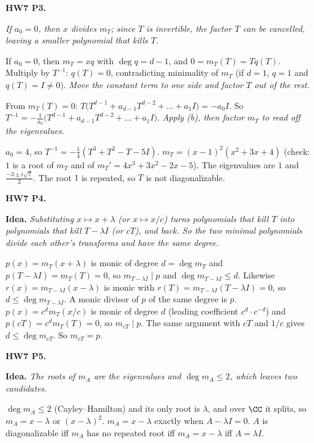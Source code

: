\documentclass[10pt]{scrartcl}
\newcommand{\idea}[1]{{\color{OliveGreen!75!black}\textbf{Idea.}} \textit{#1}\par}
\newenvironment{prob}{\par\medskip\noindent\begin{minipage}{\linewidth}\setlength{\parskip}{3pt}}{\end{minipage}\par}
\begin{document}
\begin{prob}
\textbf{HW7 P3. }\par 
\begin{enumerate}[(a)]
  \ii \idea{If $a_0=0$, then $x$ divides $m_T$; since $T$ is invertible, the factor $T$ can be cancelled, leaving a smaller polynomial that kills $T$.}
  If $a_0=0$, then $m_T=xq$ with $\deg q=d-1$, and $0=m_T(T)=Tq(T)$. Multiply by $T^{-1}$: $q(T)=0$, contradicting minimality of $m_T$ (if $d=1$, $q=1$ and $q(T)=I\ne0$).
  \ii \idea{Move the constant term to one side and factor $T$ out of the rest.}
  From $m_T(T)=0$: $T\big(T^{d-1}+a_{d-1}T^{d-2}+\dots+a_1I\big)=-a_0I$. So $T^{-1}=-\frac1{a_0}\big(T^{d-1}+a_{d-1}T^{d-2}+\dots+a_1I\big)$.
  \ii \idea{Apply (b), then factor $m_T$ to read off the eigenvalues.}
  $a_0=4$, so $T^{-1}=-\frac14(T^3+T^2-T-5I)$. $m_T=(x-1)^2(x^2+3x+4)$ (check: $1$ is a root of $m_T$ and of $m_T'=4x^3+3x^2-2x-5$). The eigenvalues are $1$ and $\frac{-3\pm i\sqrt7}2$. The root $1$ is repeated, so $T$ is not diagonalizable.
\end{enumerate}
\end{prob}

\begin{prob}
\textbf{HW7 P4. }\par 
\idea{Substituting $x\mapsto x+\lambda$ (or $x\mapsto x/c$) turns polynomials that kill $T$ into polynomials that kill $T-\lambda I$ (or $cT$), and back. So the two minimal polynomials divide each other's transforms and have the same degree.}
\begin{enumerate}[(a)]
  \ii $p(x)=m_T(x+\lambda)$ is monic of degree $d=\deg m_T$ and $p(T-\lambda I)=m_T(T)=0$, so $m_{T-\lambda I}\mid p$ and $\deg m_{T-\lambda I}\le d$. Likewise $r(x)=m_{T-\lambda I}(x-\lambda)$ is monic with $r(T)=m_{T-\lambda I}(T-\lambda I)=0$, so $d\le\deg m_{T-\lambda I}$. A monic divisor of $p$ of the same degree is $p$.
  \ii $p(x)=c^dm_T(x/c)$ is monic of degree $d$ (leading coefficient $c^d\cdot c^{-d}$) and $p(cT)=c^dm_T(T)=0$, so $m_{cT}\mid p$. The same argument with $cT$ and $1/c$ gives $d\le\deg m_{cT}$. So $m_{cT}=p$.
\end{enumerate}
\end{prob}

\begin{prob}
\textbf{HW7 P5. }\par 
\idea{The roots of $m_A$ are the eigenvalues and $\deg m_A\le2$, which leaves two candidates.}
$\deg m_A\le2$ (Cayley--Hamilton) and its only root is $\lambda$, and over $\CC$ it splits, so $m_A=x-\lambda$ or $(x-\lambda)^2$. $m_A=x-\lambda$ exactly when $A-\lambda I=0$. $A$ is diagonalizable iff $m_A$ has no repeated root iff $m_A=x-\lambda$ iff $A=\lambda I$.
\end{prob}
\end{document}
